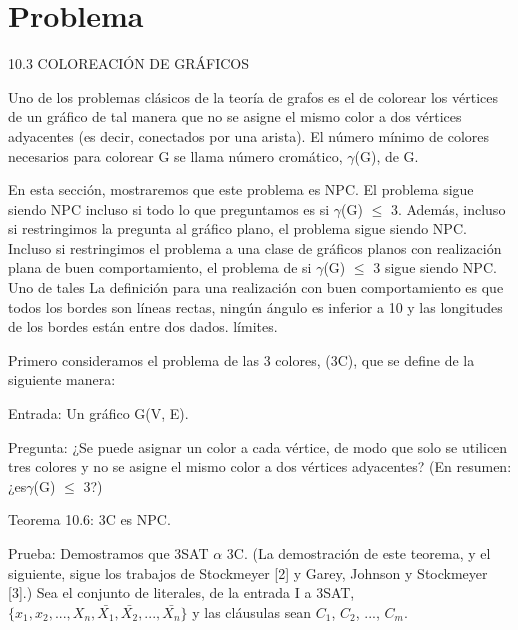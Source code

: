 \section{Problema}

10.3 COLOREACIÓN DE GRÁFICOS

Uno de los problemas clásicos de la teoría de grafos es el de colorear los vértices de un gráfico de 
tal manera que no se asigne el mismo color a dos vértices adyacentes (es decir, conectados por una arista). 
El número mínimo de colores necesarios para colorear G se llama número cromático, $\gamma$(G), de G.

En esta sección, mostraremos que este problema es NPC. El problema sigue siendo NPC incluso si todo lo que 
preguntamos es si $\gamma$(G) $\leq$ 3. Además, incluso si restringimos la pregunta al gráfico plano, el problema 
sigue siendo NPC. Incluso si restringimos el problema a una clase de gráficos planos con realización plana 
de buen comportamiento, el problema de si $\gamma$(G) $\leq$ 3 sigue siendo NPC. Uno de tales La definición para 
una realización con buen comportamiento es que todos los bordes son líneas rectas, ningún ángulo es inferior 
a 10 y las longitudes de los bordes están entre dos dados.
límites.

Primero consideramos el problema de las 3 colores, (3C), que se define de la siguiente manera:

Entrada: Un gráfico G(V, E).

Pregunta: ¿Se puede asignar un color a cada vértice, de modo que solo se utilicen tres colores y no se asigne 
el mismo color a dos vértices adyacentes? (En resumen: ¿es$\gamma$(G) $\leq$ 3?)

Teorema 10.6: 3C es NPC.


Prueba: Demostramos que 3SAT $ \alpha$ 3C. (La demostración de este teorema, y el siguiente, sigue los 
trabajos de Stockmeyer [2] y Garey, Johnson y Stockmeyer [3].) Sea el conjunto de literales, de la entrada I a 
3SAT, $\{x_{1 }, x_ {2}, . . . , X_{n}, \bar{X_{1}}, \bar{X_{2}}, ..., \bar{X_{n}} \}$ y las cláusulas 
sean $C_{1}$, $C_{2}$, ..., $C_{m}$.

